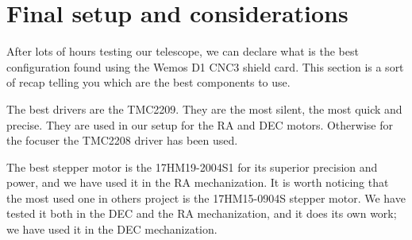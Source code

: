 \section{Final setup and considerations}
After lots of hours testing our telescope, we can declare what is the best configuration found using the Wemos D1 \+ CNC3 shield card.
This section is a sort of recap telling you which are the best components to use.

The best drivers are the TMC2209.
They are the most silent, the most quick and precise.
They are used in our setup for the RA and DEC motors.
Otherwise for the focuser the TMC2208 driver has been used. 

The best stepper motor is the 17HM19-2004S1 for its superior precision and power, and we have used it in the RA mechanization.
It is worth noticing that the most used one in others project is the 17HM15-0904S stepper motor.
We have tested it both in the DEC and the RA mechanization, and it does its own work;
we have used it in the DEC mechanization.


